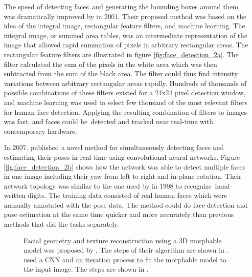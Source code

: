 The speed of detecting faces and generating the bounding boxes around them was dramatically improved by \textcite{Viola2001} in 2001. Their proposed method was based on the idea of the integral image, rectangular feature filters, and machine learning. The integral image, or summed area tables, was an intermediate representation of the image that allowed rapid summation of pixels in arbitrary rectangular areas. The rectangular feature filters are illustrated in figure \ref{fig:face_detection_2a}. The filter calculated the sum of the pixels in the white area which was then subtracted from the sum of the black area. The filter could thus find intensity variations between arbitrary rectangular areas rapidly. Hundreds of thousands of possible combinations of these filters existed for a 24x24 pixel detection window, and machine learning was used to select few thousand of the most relevant filters for human face detection. Applying the resulting combination of filters to images was fast, and faces could be detected and tracked near real-time with contemporary hardware.

In 2007, \textcite{Osadchy2007} published a novel method for simultaneously detecting faces and estimating their poses in real-time using convolutional neural networks. Figure \ref{fig:face_detection_2b} shows how the network was able to detect multiple faces in one image including their yaw from left to right and in-plane rotation. Their network topology was similar to the one used by \textcite{Lecun1998} in 1998 to recognize hand-written digits. The training data consisted of real human faces which were manually annotated with the pose data. The method could do face detection and pose estimation at the same time quicker and more accurately than previous methods that did the tasks separately.

\begin{figure}
    \centering
    
    \caption[Face reconstruction 1]{Facial geometry and texture reconstruction using a 3D morphable model was proposed by \textcite{Blanz1999}. The steps of their algorithm are shown in \protect{}. \textcite{Richardson2016a} used a \ac{CNN} and an iteration process to fit the morphable model to the input image. The steps are shown in \protect{}.}
    \label{fig:face_reconstruction_1}
\end{figure}

